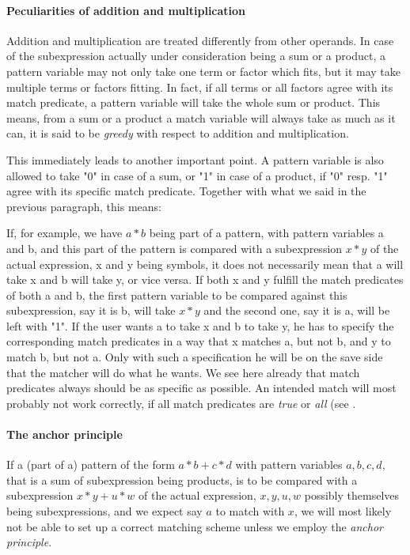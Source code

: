 \documentclass[../Maxima_Workbook.tex]{subfiles}
\begin{document}
\paragraph{Peculiarities of addition and multiplication} \mbox{}

\lz Addition and multiplication are treated differently from other operands. In case of the subexpression actually under consideration being a sum or a product, a pattern variable may not only take one term or factor which fits, but it may take multiple terms or factors fitting. In fact, if all terms or all factors agree with its match predicate, a pattern variable will take the whole sum or product. This means, from a sum or a product a match variable will always take as much as it can, it is said to be \emph{greedy} with respect to addition and multiplication.

\lz This immediately leads to another important point. A pattern variable is also allowed to take "0" in case of a sum, or "1" in case of a product, if "0" resp. "1" agree with its specific match predicate. Together with what we said in the previous paragraph, this means:

\lz If, for example, we have $ a*b $ being part of a pattern, with pattern variables a and b, and this part of the pattern is compared with a subexpression $ x*y $ of the actual expression, x and y being symbols, it does not necessarily mean that a will take x and b will take y, or vice versa. If both x and y fulfill the match predicates of both a and b, the first pattern variable to be compared against this subexpression, say it is b, will take $ x*y $ and the second one, say it is a, will be left with "1". If the user wants a to take x and b to take y, he has to specify the corresponding match predicates in a way that x matches a, but not b, and y to match b, but not a. Only with such a specification he will be on the save side that the matcher will do what he wants. We see here already that match predicates always should be as specific as possible. An intended match will most probably not work correctly, if all match predicates are \emph{true} or \emph{all} (see .

\paragraph{The anchor principle} \mbox{}

\lz If a (part of a) pattern of the form $ a*b+c*d $ with pattern variables $ a,b,c,d $, that is a sum of subexpression being products, is to be compared with a subexpression $ x*y+u*w $ of the actual expression, $ x,y,u,w $ possibly themselves being subexpressions, and we expect say $ a $ to match with $ x $, we will most likely not be able to set up a correct matching scheme unless we employ the \emph{anchor principle}. 
\end{document}
